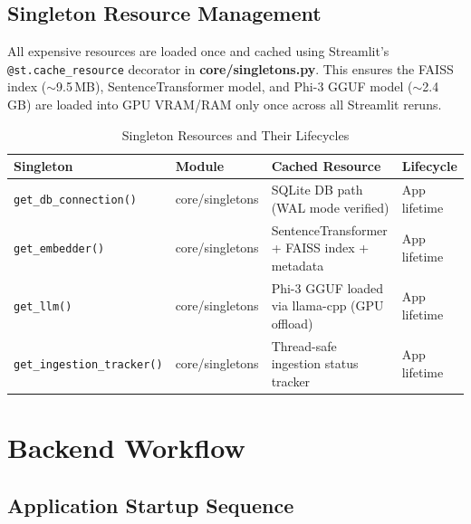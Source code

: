 \documentclass[12pt, a4paper, twoside]{article}
\begin{document}
\subsection{Singleton Resource Management}

All expensive resources are loaded once and cached using Streamlit's \texttt{@st.cache\_resource} decorator in \textbf{core/singletons.py}. This ensures the FAISS index ($\sim$9.5\,MB), SentenceTransformer model, and Phi-3 GGUF model ($\sim$2.4\,GB) are loaded into GPU VRAM/RAM only once across all Streamlit reruns.

\begin{table}[H]
\centering
\caption{Singleton Resources and Their Lifecycles}
\label{tab:singletons}
\begin{tabularx}{\textwidth}{L{3.5cm} L{2.5cm} X L{1.8cm}}
\toprule
{}\color{white}\textbf{Singleton} & \color{white}\textbf{Module} & \color{white}\textbf{Cached Resource} & \color{white}\textbf{Lifecycle} \\
\midrule
\texttt{get\_db\_connection()} & core/singletons & SQLite DB path (WAL mode verified) & App lifetime \\
\texttt{get\_embedder()} & core/singletons & SentenceTransformer + FAISS index + metadata & App lifetime \\
\texttt{get\_llm()} & core/singletons & Phi-3 GGUF loaded via llama-cpp (GPU offload) & App lifetime \\
\texttt{get\_ingestion\_tracker()} & core/singletons & Thread-safe ingestion status tracker & App lifetime \\
\bottomrule
\end{tabularx}
\end{table}

\newpage

\section{Backend Workflow}

\subsection{Application Startup Sequence}
\end{document}
